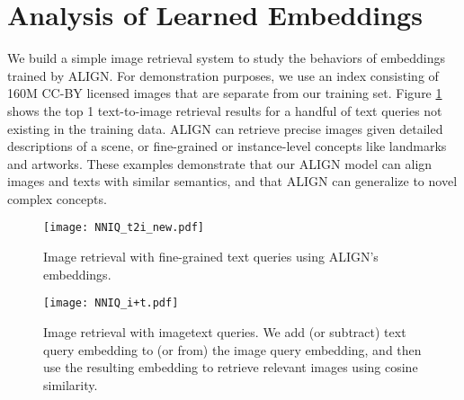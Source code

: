 \documentclass{article}
\begin{document}
\section{Analysis of Learned Embeddings}

We build a simple image retrieval system to study the behaviors of embeddings trained by ALIGN. For demonstration purposes, we use an index consisting of 160M CC-BY licensed images that are separate from our training set. Figure \ref{fig:nniq_t2i} shows the top 1 text-to-image retrieval results for a handful of text queries not existing in the training data. ALIGN can retrieve precise images given detailed descriptions of a scene, or fine-grained or instance-level concepts like landmarks and artworks. These examples demonstrate that our ALIGN model can align images and texts with similar semantics, and that ALIGN can generalize to novel complex concepts.

\begin{figure}[!htb]
\vspace{-1mm}
\begin{center}
    \centerline{\texttt{[image: NNIQ\_t2i\_new.pdf]}}
    \vskip -0.1in
    \caption{Image retrieval with fine-grained text queries using ALIGN's embeddings.}
    \label{fig:nniq_t2i}
\end{center}
\vspace{-6mm}
\end{figure}

\begin{figure}[h!]
\begin{center}
    \centerline{\texttt{[image: NNIQ\_i+t.pdf]}}
    \vskip -0.1in
    \caption{Image retrieval with imagetext queries. We add (or subtract) text query embedding to (or from) the image query embedding, and then use the resulting embedding to retrieve relevant images using cosine similarity.}
    \label{fig:nniq_i+t}
\end{center}
\vspace{-7mm}
\end{figure}
\end{document}
